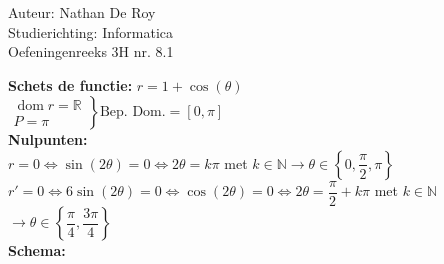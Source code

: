 \documentclass[a4paper]{article}
\begin{document}
\noindent \large Auteur: Nathan De Roy \\
\noindent \large Studierichting: Informatica\\
\noindent \large Oefeningenreeks 3H nr. 8.1\\

\medskip
\normalsize


\noindent \textbf{Schets de functie:} $r = 1 + \cos(\theta)$\\

$\left .
\begin{array}{l}
    \operatorname{dom} r    = \mathbb{R}\\
    P                       = \pi
\end{array}
\right \}
\text{Bep. Dom.} = [0, \pi]$\\

\noindent \textbf{Nulpunten:}\\

$r = 0 \Leftrightarrow \sin(2\theta) = 0 \Leftrightarrow 2\theta = k\pi$ met $k \in \mathbb{N} \longrightarrow \theta \in \left\{0, \dfrac{\pi}{2}, \pi\right\}$\\

$r' = 0 \Leftrightarrow 6\sin(2\theta) = 0 \Leftrightarrow \cos(2\theta) = 0 \Leftrightarrow 2\theta = \dfrac{\pi}{2} + k\pi$ met $k \in \mathbb{N}$\\

$\longrightarrow \theta \in \left\{ \dfrac{\pi}{4}, \dfrac{3\pi}{4}\right\}$\\

\noindent \textbf{Schema:}\\

\end{document}
